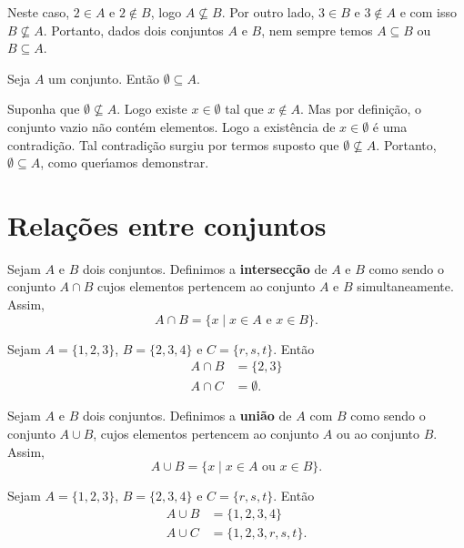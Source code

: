 Neste caso, $2 \in A$ e $2 \notin B$, logo $A \nsubseteq B$. Por outro lado, $3 \in B$ e $3 \notin A$ e com isso $B \nsubseteq A$. Portanto, dados dois conjuntos $A$ e $B$, nem sempre temos $A \subseteq B$ ou $B \subseteq A$.

\begin{proposicao} 
	Seja $A$ um conjunto. Ent{\~a}o $ \emptyset \subseteq A$.
\end{proposicao}
\begin{prova}
	Suponha que $\emptyset \nsubseteq A$. Logo existe $x \in \emptyset$ tal que $x \notin A$. Mas por defini{\c c}{\~a}o, o conjunto vazio n{\~a}o cont{\'e}m elementos. Logo a exist\^encia de $x \in \emptyset$ {\'e} uma contradi{\c c}{\~a}o. Tal contradi\c{c}\~ao surgiu por termos suposto que $\emptyset \nsubseteq A$. Portanto, $\emptyset \subseteq A$, como quer{\'\i}amos demonstrar.
\end{prova}

\section{Rela{\c c}{\~o}es entre conjuntos}

\begin{definicao}\label{intersecao_conjunto}
Sejam $A$ e $B$ dois conjuntos. Definimos a \textbf{intersec{\c c}{\~a}o} de $A$ e $B$ como sendo o conjunto $A \cap B$ cujos elementos pertencem ao conjunto $A$ e $B$ simultaneamente. Assim,
\[
A \cap B = \{x \mid x \in A\mbox{ e }  x \in B\}.
\]
\end{definicao}

\begin{exemplo}
	Sejam $A = \{1, 2, 3\}$, $B = \{2, 3, 4\}$ e $C = \{r, s, t\}$. Ent\~ao
	\begin{align*}
		A \cap B &= \{2, 3\}\\
		A \cap C &= \emptyset.
	\end{align*}
\end{exemplo}

\begin{definicao}\label{unicao_conjuntos}
Sejam $A$ e $B$ dois conjuntos. Definimos a \textbf{uni{\~a}o} de $A$ com $B$ como sendo o conjunto $A \cup B$, cujos elementos pertencem ao conjunto $A$ ou ao conjunto $B$. Assim,
\[
A \cup B = \{x \mid x \in A \mbox{ ou } x \in B\}.
\]
\end{definicao}

\begin{exemplo}
	Sejam $A = \{1, 2, 3\}$, $B = \{2, 3, 4\}$ e $C = \{r, s, t\}$. Ent\~ao
	\begin{align*}
		A \cup B &= \{1,2,3,4\}\\
		A \cup C &= \{1,2,3,r,s,t\}.
	\end{align*}
\end{exemplo}

